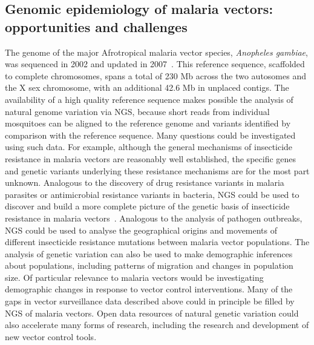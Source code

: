 \begin{refsection}
\section{Genomic epidemiology of malaria vectors: opportunities and challenges}\label{sec:genomic-epi}


The genome of the major Afrotropical malaria vector species, \textit{Anopheles gambiae}, was sequenced in 2002 and updated in 2007~\parencite{Holt2002,Sharakhova2007}.
%
This reference sequence, scaffolded to complete chromosomes, spans a total of 230 Mb across the two autosomes and the X sex chromosome, with an additional 42.6 Mb in unplaced contigs.
%
The availability of a high quality reference sequence makes possible the analysis of natural genome variation via NGS, because short reads from individual mosquitoes can be aligned to the reference genome and variants identified by comparison with the reference sequence.
%
Many questions could be investigated using such data.
%
For example, although the general mechanisms of insecticide resistance in malaria vectors are reasonably well established, the specific genes and genetic variants underlying these resistance mechanisms are for the most part unknown.
%
Analogous to the discovery of drug resistance variants in malaria parasites or antimicrobial resistance variants in bacteria, NGS could be used to discover and build a more complete picture of the genetic basis of insecticide resistance in malaria vectors~\parencite{Donnelly2016}.
%
Analogous to the analysis of pathogen outbreaks, NGS could be used to analyse the geographical origins and movements of different insecticide resistance mutations between malaria vector populations.
%
The analysis of genetic variation can also be used to make demographic inferences about populations, including patterns of migration and changes in population size.
%
Of particular relevance to malaria vectors would be investigating demographic changes in response to vector control interventions.
%
Many of the gaps in vector surveillance data described above could in principle be filled by NGS of malaria vectors.
%
Open data resources of natural genetic variation could also accelerate many forms of research, including the research and development of new vector control tools.



\end{refsection}
